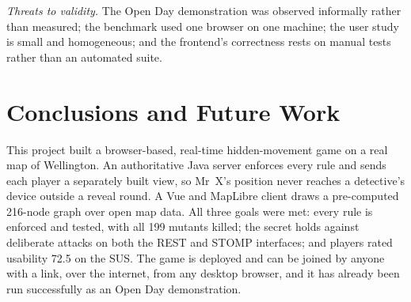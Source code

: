 \documentclass[lettersize,journal]{IEEEtran}
\begin{document}
\emph{Threats to validity.} The Open Day demonstration was observed informally rather than measured; the benchmark used one browser on one machine; the user study is small and homogeneous; and the frontend's correctness rests on manual tests rather than an automated suite.

\section{Conclusions and Future Work}\label{sec:conclusion}

This project built a browser-based, real-time hidden-movement game on a real map of Wellington. An authoritative Java server enforces every rule and sends each player a separately built view, so Mr~X's position never reaches a detective's device outside a reveal round. A Vue and MapLibre client draws a pre-computed 216-node graph over open map data. All three goals were met: every rule is enforced and tested, with all 199 mutants killed; the secret holds against deliberate attacks on both the REST and STOMP interfaces; and players rated usability 72.5 on the SUS. The game is deployed and can be joined by anyone with a link, over the internet, from any desktop browser, and it has already been run successfully as an Open Day demonstration.
\end{document}
